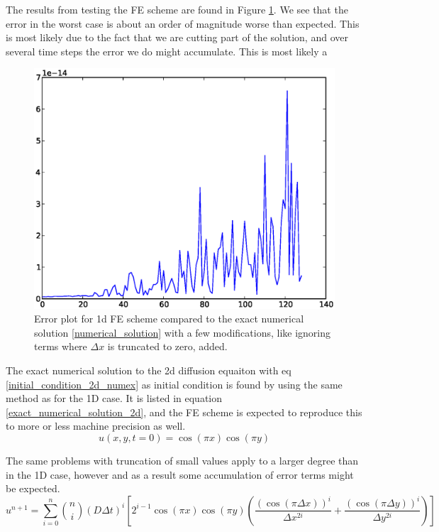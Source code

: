 The results from testing the FE scheme are found in Figure \ref{errorplot_numerical_exact_FE_1D}. We see that the error in the worst case is about an order of magnitude worse than expected. This is most likely due to the fact that we are cutting part of the solution, and over several time steps the error we do might accumulate.
This is most likely a 

\begin{figure}[H]
 \centering
 \includegraphics[scale=0.7]{Figures/exact_numerical_1d_n130.eps}
 \caption[Verification for exact numerical solution]{Error plot for 1d FE scheme compared to the exact numerical solution \ref{numerical_solution} with a few modifications, like ignoring terms where $\Delta x$ is truncated to zero, added.}
 \label{errorplot_numerical_exact_FE_1D}
\end{figure}
The exact numerical solution to the 2d diffusion equaiton with eq \ref{initial_condition_2d_numex} as initial condition is found by using the same method as for the 1D case.
It is listed in equation \eqref{exact_numerical_solution_2d}, and the FE scheme is expected to reproduce this to more or less machine precision as well. 
\begin{equation}\label{initial_condition_2d_numex}
 u(x,y,t=0) = \cos(\pi x)\cos(\pi y)
\end{equation}

The same problems with truncation of small values apply to a larger degree than in the 1D case, however and as a result some accumulation of error terms might be expected. 
\begin{equation}\label{exact_numerical_solution_2d}
 u^{n+1} = \sum\limits^n_{i=0}{n\choose i}\left(D\Delta t\right)^i\left[2^{i-1}\cos(\pi x)\cos(\pi y)\left(\frac{(\cos(\pi\Delta x))^i}{\Delta x^{2i}} +\frac{(\cos(\pi\Delta y))^i}{\Delta y^{2i}}\right)\right]
\end{equation}

